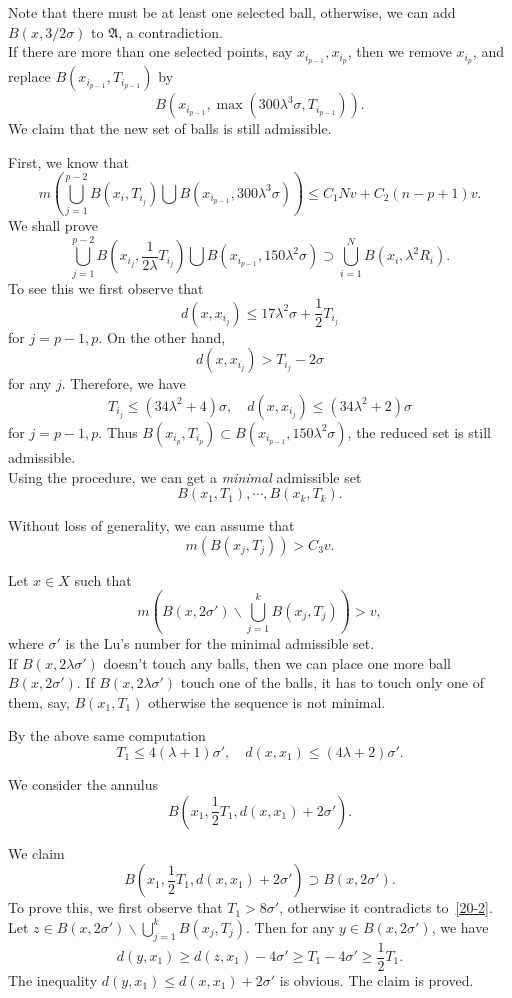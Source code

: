 Note that there must be at least one selected ball, otherwise, we can add $B(x,3/2\sigma)$ to $\mathfrak A$, a contradiction.\\

If there are more than one selected points, say $x_{i_{p-1}}, x_{i_p}$, 
then we remove $x_{i_p}$, and replace $B(x_{i_{p-1}}, T_{i_{p-1}})$ by $$B(x_{i_{p-1}}, \max(300\lambda^3\sigma, T_{i_{p-1}}) ).$$ We claim that the new set of  balls is  still admissible. 


First, we know that
\[
m(\bigcup_{j=1}^{p-2} B(x_i,T_{i_j} )\bigcup B(x_{i_{p-1}}, 300\lambda^3\sigma))\leq C_1Nv+C_2(n-p+1)v.
\]
We shall prove
\[
 \bigcup_{j=1} ^{p-2} B(x_{i_j}, \frac{1}{2\lambda}T_{i_j})\bigcup B(x_{i_{p-1}}, 150\lambda^2\sigma)\supset
 \bigcup_{i=1}^{N} B(x_i,  \lambda^2 R_i).
 \]
 To see this 
we first observe that  
 \[
 d(x,x_{i_j})\leq 17\lambda^2\sigma+\frac 12 T_{i_j}
 \]
 for  $j=p-1,p$.
 On the other hand, 
 \[
 d(x,x_{i_j})>T_{i_j}-2\sigma
 \]
 for any $j$.
 Therefore, we have
 \[
 T_{i_j}\leq (34\lambda^2+4)\sigma,\quad d(x,x_{i_j})\leq (34\lambda^2+2)\sigma
 \]
 for $j=p-1,p$. 
Thus $B(x_{i_p}, T_{i_p})\subset B(x_{i_{p-1}}, 150\lambda^2\sigma)$, the reduced set is still admissible. \\

Using the  procedure, we can get a \emph{minimal} admissible set 
\[
B(x_1,T_1),\cdots, B(x_k, T_k).
\]

Without loss of generality, we can assume that 
\begin{equation}\label{20-2}
m(B(x_j, T_j))>C_3 v.
\end{equation}


Let $x\in X$ such that 
\[
m(B(x,2\sigma')\backslash \bigcup_{j=1} ^k B(x_{j}, T_{j}))>v,
\]
where $\sigma'$ is the Lu's number for the minimal admissible set. \\

If $B(x,2\lambda\sigma')$ doesn't touch any balls, then we can place one more ball $B(x,2\sigma')$. If $B(x,2\lambda\sigma')$ touch one of the balls, it has to touch only one of them, say, $B(x_1,T_1)$ otherwise the sequence is not minimal. 

By the above same computation
\[
T_1\leq 4(\lambda+1)\sigma',\quad d(x,x_1)\leq (4\lambda+2)\sigma'.
\]

We consider the annulus $$B(x_1,\frac 12T_1, d(x,x_1)+2\sigma').$$ 

We claim
\[
B(x_1,\frac 12T_1, d(x,x_1)+2\sigma')\supset B(x,2\sigma').
\]
To prove this, we first observe  that 
 $T_1>8\sigma'$, otherwise it contradicts to~\eqref{20-2}. 
 Let
 $z\in B(x,2\sigma')\backslash \bigcup_{j=1} ^k B(x_{j}, T_{j})$.
Then for any $y\in B(x,2\sigma')$, we have
\[
d(y,x_1)\geq d(z,x_1)-4\sigma'\geq T_1-4\sigma'\geq \frac 12 T_1.
\]
The inequality $d(y,x_1)\leq d(x,x_1)+2\sigma'$ is obvious. The claim is proved. \\


